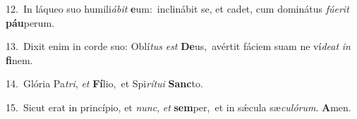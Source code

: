 {\numbfont\textcolor{\numbcolor}{12.}}~In láqueo suo humili\-\textit{á}\-\textit{bit} \textbf{e}\-um:~\star inclinábit se, et cadet, cum dominátus \textit{fú}\-\textit{e}\textit{rit} \textbf{páu}\-perum.\par
{\numbfont\textcolor{\numbcolor}{13.}}~Dixit enim in corde suo: Oblí\textit{tus} \textit{est} \textbf{De}\-us,~\star avértit fáciem suam ne ví\-\textit{de}\-\textit{at} \textit{in} \textbf{fi}\-nem.\par
{\numbfont\textcolor{\numbcolor}{14.}}~Glória Pa\-\textit{tri}\-, \textit{et} \textbf{Fí}\-lio,~\star et Spi\-\textit{rí}\-\textit{tu}\textit{i} \textbf{Sanc}\-to.\par
{\numbfont\textcolor{\numbcolor}{15.}}~Sicut erat in princípio, et \textit{nunc}\-, \textit{et} \textbf{sem}\-per,~\star et in sǽcula sæ\-\textit{cu}\-\textit{ló}\textit{rum}. \textbf{A}\-men.\par
